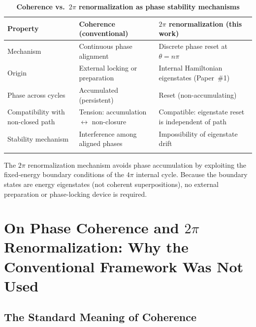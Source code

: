\documentclass[%
 reprint, amsmath,amssymb, aps, prd, ]{revtex4-2}
\numberwithin{equation}{section}
\newcommand{\iphase}{\theta}
\begin{document}
\begin{table}[t!]
\centering
\caption{\textbf{Coherence vs.\ $2\pi$ renormalization as phase stability mechanisms}}
\label{tab:coherence_vs_renorm}
\renewcommand{\arraystretch}{1.4}
\begin{tabular}{p{3.5cm}p{5.5cm}p{6.5cm}}
\toprule
\textbf{Property} & \textbf{Coherence (conventional)} & \textbf{$2\pi$ renormalization (this work)} \\
\midrule
Mechanism
& Continuous phase alignment
& Discrete phase reset at $\iphase = n\pi$ \\
\addlinespace[0.3cm]
Origin
& External locking or preparation
& Internal Hamiltonian eigenstates (Paper~\#1) \\
\addlinespace[0.3cm]
Phase across cycles
& Accumulated (persistent)
& Reset (non-accumulating) \\
\addlinespace[0.3cm]
Compatibility with non-closed path
& Tension: accumulation $\leftrightarrow$ non-closure
& Compatible: eigenstate reset is independent of path \\
\addlinespace[0.3cm]
Stability mechanism
& Interference among aligned phases
& Impossibility of eigenstate drift \\
\addlinespace[0.2cm]
\bottomrule
\end{tabular}
\vspace{0.2cm}
\begin{minipage}{0.95\textwidth}
\justifying\footnotesize
The $2\pi$ renormalization mechanism avoids phase accumulation by exploiting the fixed-energy boundary conditions of the $4\pi$ internal cycle. Because the boundary states are energy eigenstates (not coherent superpositions), no external preparation or phase-locking device is required.
\end{minipage}
\end{table}

\appendix

\section{On Phase Coherence and $2\pi$ Renormalization: Why the Conventional Framework Was Not Used}
\label{app:coherence}

\subsection{The Standard Meaning of Coherence}
\end{document}
